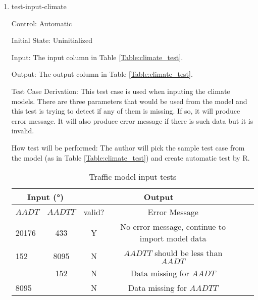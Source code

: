 \documentclass[12pt, titlepage]{article}
\begin{document}
\begin{enumerate}

\item{test-input-climate\\}

Control: Automatic
					
Initial State: Uninitialized
					
Input: The input column in Table \ref{Table:climate_test}.
					
Output: The output column in Table \ref{Table:climate_test}. 

Test Case Derivation: This test case is used when inputing the climate models. There are three parameters that would be used from the model and this test is trying to detect if any of them is missing. If so, it will produce error message. It will also produce error message if there is such data but it is invalid. 
					
How test will be performed: The author will pick the sample test case from the model (as in Table \ref{Table:climate_test}) and create automatic test by R.



\begin{center}
\begin{table}[h]
\resizebox{\textwidth}{!}
{ %
    \begin{tabular}{ lccccc }
    \hline
      \multicolumn{2}{c|}{Input (\si[per-mode=symbol] {\degree}) }                            & \multicolumn{2}{c}{Output} \\ 
    
    \hline

        $AADT$   &   $AADTT$   &   valid?   &   Error Message \\ \hline
    
       20176  & 433 &   Y  &  No error message, continue to import model data          \\      \hline
       152  & 8095 &   N  & $AADTT$ should be less than $AADT$                        \\      \hline
         & 152 &   N  & Data missing for $AADT$                        \\      \hline
       8095 & &   N  & Data missing for $AADTT$                        \\      \hline
    
    \end{tabular} %
}
\caption{Traffic model input tests}
\label{Table:traffic_test}
\end{table}
\end{center}


\end{enumerate}
\end{document}
